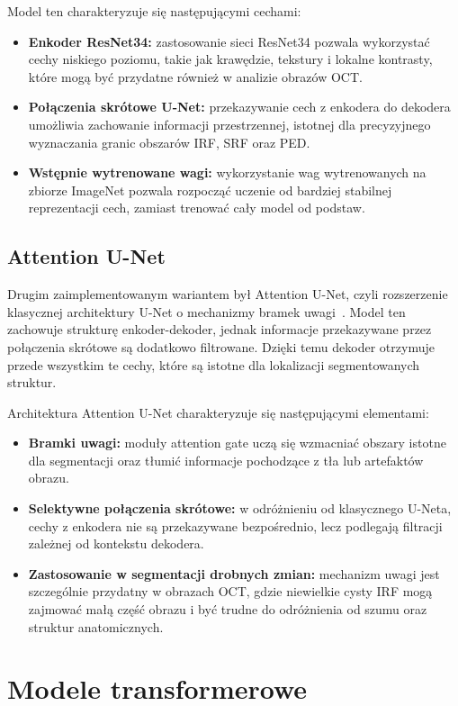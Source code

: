 \documentclass[12pt,a4paper,oneside]{report}
\begin{document}
Model ten charakteryzuje się następującymi cechami:
\begin{itemize}
    \item \textbf{Enkoder ResNet34:} zastosowanie sieci ResNet34 pozwala wykorzystać cechy niskiego poziomu, takie jak krawędzie, tekstury i lokalne kontrasty, które mogą być przydatne również w analizie obrazów OCT.
    \item \textbf{Połączenia skrótowe U-Net:} przekazywanie cech z enkodera do dekodera umożliwia zachowanie informacji przestrzennej, istotnej dla precyzyjnego wyznaczania granic obszarów IRF, SRF oraz PED.
    \item \textbf{Wstępnie wytrenowane wagi:} wykorzystanie wag wytrenowanych na zbiorze ImageNet pozwala rozpocząć uczenie od bardziej stabilnej reprezentacji cech, zamiast trenować cały model od podstaw.
\end{itemize}

\subsection{Attention U-Net}

Drugim zaimplementowanym wariantem był Attention U-Net, czyli rozszerzenie klasycznej architektury U-Net o mechanizmy bramek uwagi~\cite{oktay2018attention}. Model ten zachowuje strukturę enkoder-dekoder, jednak informacje przekazywane przez połączenia skrótowe są dodatkowo filtrowane. Dzięki temu dekoder otrzymuje przede wszystkim te cechy, które są istotne dla lokalizacji segmentowanych struktur.

Architektura Attention U-Net charakteryzuje się następującymi elementami:
\begin{itemize}
    \item \textbf{Bramki uwagi:} moduły attention gate uczą się wzmacniać obszary istotne dla segmentacji oraz tłumić informacje pochodzące z tła lub artefaktów obrazu.
    \item \textbf{Selektywne połączenia skrótowe:} w odróżnieniu od klasycznego U-Neta, cechy z enkodera nie są przekazywane bezpośrednio, lecz podlegają filtracji zależnej od kontekstu dekodera.
    \item \textbf{Zastosowanie w segmentacji drobnych zmian:} mechanizm uwagi jest szczególnie przydatny w obrazach OCT, gdzie niewielkie cysty IRF mogą zajmować małą część obrazu i być trudne do odróżnienia od szumu oraz struktur anatomicznych.
\end{itemize}

\section{Modele transformerowe}
\end{document}
